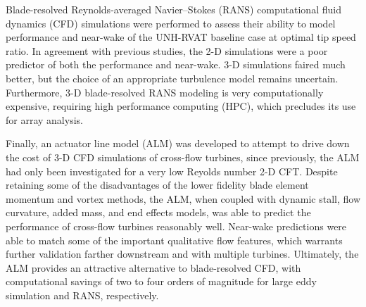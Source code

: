 \begin{Abstractpage}
{Blade-resolved Reynolds-averaged Navier--Stokes (RANS) computational fluid
dynamics (CFD) simulations were performed to assess their ability to model
performance and near-wake of the UNH-RVAT baseline case at optimal tip speed
ratio. In agreement with previous studies, the 2-D simulations were a poor
predictor of both the performance and near-wake. 3-D simulations faired much
better, but the choice of an appropriate turbulence model remains uncertain.
Furthermore, 3-D blade-resolved RANS modeling is very computationally expensive,
requiring high performance computing (HPC), which precludes its use for array
analysis.

Finally, an actuator line model (ALM) was developed to attempt to drive down the
cost of 3-D CFD simulations of cross-flow turbines, since previously, the ALM
had only been investigated for a very low Reyolds number 2-D CFT. Despite
retaining some of the disadvantages of the lower fidelity blade element momentum
and vortex methods, the ALM, when coupled with dynamic stall, flow curvature,
added mass, and end effects models, was able to predict the performance of
cross-flow turbines reasonably well. Near-wake predictions were able to match
some of the important qualitative flow features, which warrants further
validation farther downstream and with multiple turbines. Ultimately, the ALM
provides an attractive alternative to blade-resolved CFD, with computational
savings of two to four orders of magnitude for large eddy simulation and RANS,
respectively.

}


\end{Abstractpage}
